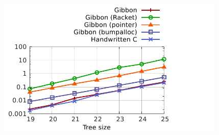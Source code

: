 \documentclass[a4paper,english]{lipics-v2016}
\begin{document}
\begin{figure}[t]
  \hspace{5mm}
  \centering
  \includegraphics[width=4.3in]{./figs/shootout_treebench_five.pdf}


\end{figure}
\end{document}
